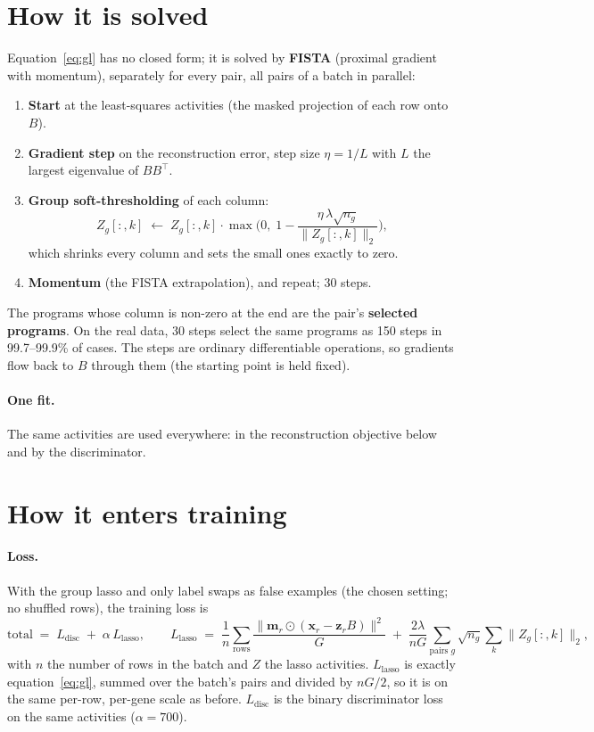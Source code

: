 \documentclass[11pt]{article}
\newcommand{\x}{\mathbf{x}}
\newcommand{\z}{\mathbf{z}}
\newcommand{\m}{\mathbf{m}}
\newcommand{\T}{^{\top}}
\begin{document}
\section{How it is solved}

Equation~\eqref{eq:gl} has no closed form; it is solved by
\textbf{FISTA} (proximal gradient with momentum), separately for every pair,
all pairs of a batch in parallel:
\begin{enumerate}
  \item \textbf{Start} at the least-squares activities (the masked projection of
  each row onto $B$).
  \item \textbf{Gradient step} on the reconstruction error, step size
  $\eta=1/L$ with $L$ the largest eigenvalue of $BB\T$.
  \item \textbf{Group soft-thresholding} of each column:
  \[
    Z_g[:,k]\;\leftarrow\;Z_g[:,k]\cdot\max\!\Big(0,\;1-\frac{\eta\,\lambda\sqrt{n_g}}{\|Z_g[:,k]\|_2}\Big),
  \]
  which shrinks every column and sets the small ones exactly to zero.
  \item \textbf{Momentum} (the FISTA extrapolation), and repeat; 30 steps.
\end{enumerate}
The programs whose column is non-zero at the end are the pair's \textbf{selected
programs}. On the real data, 30 steps select the same programs as 150 steps in
99.7--99.9\% of cases. The steps are ordinary differentiable operations, so
gradients flow back to $B$ through them (the starting point is held fixed).

\paragraph{One fit.} The same activities are used everywhere: in the
reconstruction objective below and by the discriminator.

\section{How it enters training}

\paragraph{Loss.} With the group lasso and only label swaps as false examples
(the chosen setting; no shuffled rows), the training loss is
\begin{equation}
  \text{total} \;=\; L_\text{disc} \;+\; \alpha\,L_\text{lasso},
  \qquad
  L_\text{lasso} \;=\; \frac1{n}\sum_{\text{rows}} \frac{\|\m_r\odot(\x_r-\z_r B)\|^2}{G}
  \;+\; \frac{2\lambda}{nG}\sum_{\text{pairs } g}\sqrt{n_g}\sum_k\|Z_g[:,k]\|_2 ,
\end{equation}
with $n$ the number of rows in the batch and $Z$ the lasso activities. $L_\text{lasso}$ is exactly equation~\eqref{eq:gl}, summed over the
batch's pairs and divided by $nG/2$, so it is on the same per-row, per-gene
scale as before. $L_\text{disc}$ is the binary discriminator loss on the same
activities ($\alpha=700$).
\end{document}
